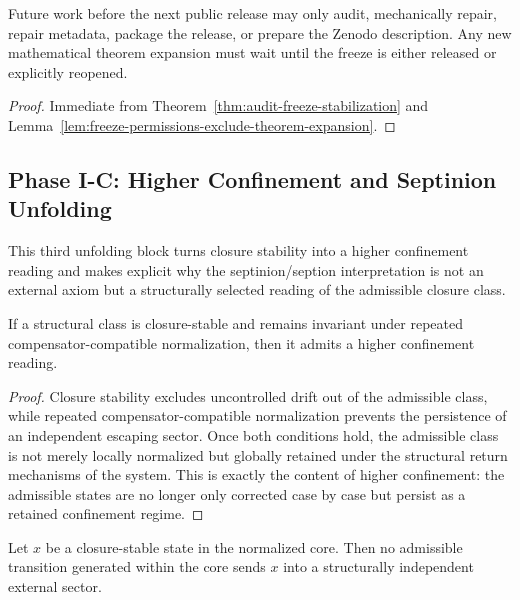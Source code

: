 \begin{corollary}
\label{cor:audit-freeze-working-rule}
Future work before the next public release may only audit, mechanically repair, repair metadata, package the release, or prepare the Zenodo description.  Any new mathematical theorem expansion must wait until the freeze is either released or explicitly reopened.
\end{corollary}

\begin{proof}
Immediate from Theorem~\ref{thm:audit-freeze-stabilization} and Lemma~\ref{lem:freeze-permissions-exclude-theorem-expansion}.
\end{proof}



\subsection*{Phase I-C: Higher Confinement and Septinion Unfolding}

This third unfolding block turns closure stability into a higher confinement
reading and makes explicit why the septinion/seption interpretation is not an
external axiom but a structurally selected reading of the admissible closure
class.

\begin{lemma}
\label{lem:higher-confinement-lemma}
If a structural class is closure-stable and remains invariant under repeated
compensator-compatible normalization, then it admits a higher confinement
reading.
\end{lemma}

\begin{proof}
Closure stability excludes uncontrolled drift out of the admissible class, while
repeated compensator-compatible normalization prevents the persistence of an
independent escaping sector. Once both conditions hold, the admissible class is
not merely locally normalized but globally retained under the structural return
mechanisms of the system. This is exactly the content of higher confinement:
the admissible states are no longer only corrected case by case but persist as a
retained confinement regime.
\end{proof}

\begin{lemma}
\label{lem:non-escape-lemma}
Let $x$ be a closure-stable state in the normalized core. Then no admissible
transition generated within the core sends $x$ into a structurally independent
external sector.
\end{lemma}

